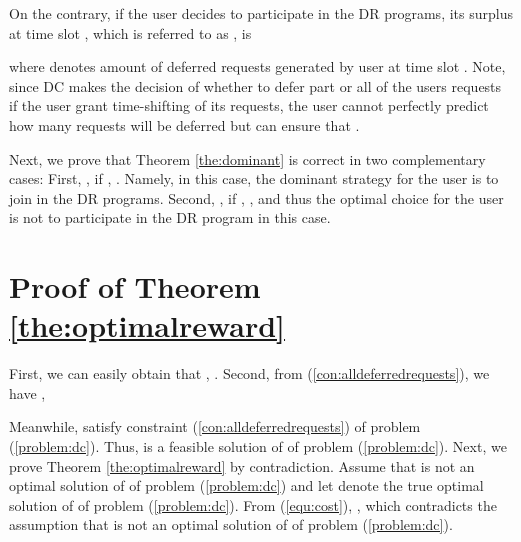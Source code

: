 \documentclass[conference]{IEEEtran}
\begin{document}
On the contrary, if the user decides to participate in the DR programs, its surplus at time slot , which is referred to as , is

where  denotes amount of deferred requests generated by user  at time slot . Note, since DC makes the decision of whether to defer part or all of the users requests if the user grant time-shifting of its requests, the user cannot perfectly predict how many requests will be deferred but can ensure that .

\noindent
Next, we prove that Theorem \ref{the:dominant} is correct in two complementary cases: First, , if , . Namely, in this case, the dominant strategy for the user is to join in the DR programs. Second, , if  , , and thus the optimal choice for the user is not to participate in the DR program in this case. 


\section{Proof of Theorem \ref{the:optimalreward}}\label{proo:optimal}
First, we can easily obtain that , . Second, from (\ref{con:alldeferredrequests}), we have ,

Meanwhile,  satisfy constraint (\ref{con:alldeferredrequests}) of problem (\ref{problem:dc}). Thus,   is a feasible solution of  of problem (\ref{problem:dc}). Next, we prove Theorem \ref{the:optimalreward} by contradiction. Assume that  is not an optimal solution of  of problem (\ref{problem:dc}) and let  denote the true optimal solution of  of problem (\ref{problem:dc}). From (\ref{equ:cost}), , which contradicts the assumption that  is not an optimal solution of  of problem (\ref{problem:dc}).
\end{document}
